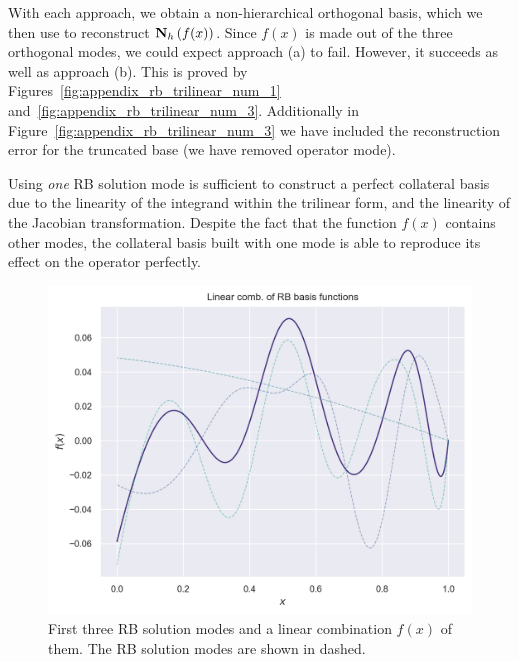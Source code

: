 \documentclass[../../thesis.tex]{subfiles}
\begin{document}
With each approach, we obtain a non-hierarchical orthogonal basis,
which we then use to reconstruct $\vb{N}_h\left(f(x)\right)$.
Since $f(x)$ is made out of the three orthogonal modes, 
we could expect approach (a) to fail.
However, it succeeds as well as approach (b).
This is proved by Figures~\ref{fig:appendix_rb_trilinear_num_1} 
and~\ref{fig:appendix_rb_trilinear_num_3}.
Additionally in Figure~\ref{fig:appendix_rb_trilinear_num_3} we have included 
the reconstruction error for the truncated base (we have removed operator mode). 

Using \textit{one} RB solution mode is sufficient to construct a perfect collateral basis
due to the linearity of the integrand within the trilinear form,
and the linearity of the Jacobian transformation.
Despite the fact that the function $f(x)$ contains other modes, 
the collateral basis built with one mode is able to reproduce its effect on the operator perfectly. 
\begin{figure}[h]
    \includegraphics[width=\columnwidth]{research_project/piston/figures/svd_fourier/linear_combination.png}
    \caption{First three RB solution modes and a linear combination $f(x)$ of them.  
    The RB solution modes are shown in dashed.}
    \label{fig:appendix_rb_linear_combination}
\end{figure}
\end{document}
